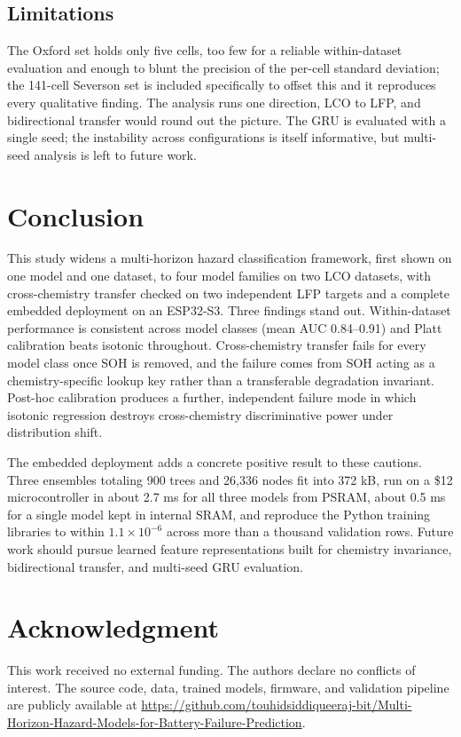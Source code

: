 \documentclass[journal]{IEEEtran}
\begin{document}
\subsection{Limitations}
The Oxford set holds only five cells, too few for a reliable within-dataset evaluation and enough to blunt the precision of the per-cell standard deviation; the 141-cell Severson set is included specifically to offset this and it reproduces every qualitative finding. The analysis runs one direction, LCO to LFP, and bidirectional transfer would round out the picture. The GRU is evaluated with a single seed; the instability across configurations is itself informative, but multi-seed analysis is left to future work.

\section{Conclusion}
This study widens a multi-horizon hazard classification framework, first shown on one model and one dataset, to four model families on two LCO datasets, with cross-chemistry transfer checked on two independent LFP targets and a complete embedded deployment on an ESP32-S3. Three findings stand out. Within-dataset performance is consistent across model classes (mean AUC 0.84--0.91) and Platt calibration beats isotonic throughout. Cross-chemistry transfer fails for every model class once SOH is removed, and the failure comes from SOH acting as a chemistry-specific lookup key rather than a transferable degradation invariant. Post-hoc calibration produces a further, independent failure mode in which isotonic regression destroys cross-chemistry discriminative power under distribution shift.

The embedded deployment adds a concrete positive result to these cautions. Three ensembles totaling 900 trees and 26,336 nodes fit into 372 kB, run on a \$12 microcontroller in about 2.7 ms for all three models from PSRAM, about 0.5 ms for a single model kept in internal SRAM, and reproduce the Python training libraries to within $1.1\times10^{-6}$ across more than a thousand validation rows. Future work should pursue learned feature representations built for chemistry invariance, bidirectional transfer, and multi-seed GRU evaluation.

\section*{Acknowledgment}
This work received no external funding. The authors declare no conflicts of interest. The source code, data, trained models, firmware, and validation pipeline are publicly available at \url{https://github.com/touhidsiddiqueeraj-bit/Multi-Horizon-Hazard-Models-for-Battery-Failure-Prediction}.
\end{document}
